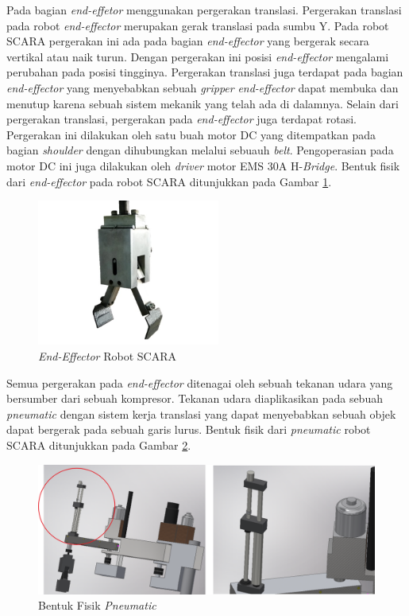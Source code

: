 Pada bagian \textit{end-effetor} menggunakan pergerakan translasi. Pergerakan translasi pada robot \textit{end-effector} merupakan gerak translasi pada sumbu Y. Pada robot SCARA pergerakan ini ada pada bagian \textit{end-effector} yang bergerak secara vertikal atau naik turun. Dengan pergerakan ini posisi \textit{end-effector} mengalami perubahan pada posisi tingginya. Pergerakan translasi juga terdapat pada bagian \textit{end-effector} yang menyebabkan sebuah \textit{gripper }\textit{ end-effector} dapat membuka dan menutup karena sebuah sistem mekanik yang telah ada di dalamnya. Selain dari pergerakan translasi, pergerakan pada \textit{end-effector} juga terdapat rotasi. Pergerakan ini dilakukan oleh satu buah motor DC yang ditempatkan pada bagian \textit{shoulder} dengan dihubungkan melalui sebuauh \textit{belt}. Pengoperasian pada motor DC ini juga dilakukan oleh \textit{driver} motor EMS 30A H-\textit{Bridge}. Bentuk fisik dari \textit{end-effector} pada robot SCARA ditunjukkan pada Gambar \ref{pic.endeffectorfisik}.
\begin{figure}[H]
	\centering
	\includegraphics[width=6cm]{gambar/capitsementara.jpg}
	\caption{\textit{End-Effector} Robot SCARA}
	\label{pic.endeffectorfisik}
	
\end{figure}
Semua pergerakan pada \textit{end-effector} ditenagai oleh sebuah tekanan udara yang bersumber dari sebuah kompresor. Tekanan udara diaplikasikan pada sebuah \textit{pneumatic} dengan sistem kerja translasi yang dapat menyebabkan sebuah objek dapat bergerak pada sebuah garis lurus. Bentuk fisik dari \textit{pneumatic} robot SCARA ditunjukkan pada Gambar \ref{pic.pneumatic}.
\begin{figure}[H]
	\centering
	\includegraphics[width=12cm]{gambar/pneumatic.png}
	\caption{Bentuk Fisik \textit{Pneumatic}}
	\label{pic.pneumatic}
\end{figure}

